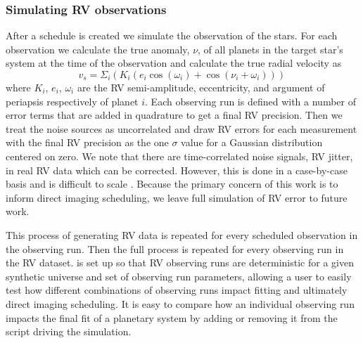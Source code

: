 \subsubsection{Simulating RV observations}
After a schedule is created we simulate the observation of the stars. For each
observation we calculate the true anomaly, $\nu$, of all planets in the target
star's system at the time of the observation and calculate the true radial
velocity as 
\begin{equation}
v_s = \Sigma_i \left(K_i \left(e_i
\cos(\omega_i) + \cos(\nu_i + \omega_i)\right)\right) \,
  \label{eq:system_rv}
\end{equation}
where $K_i$, $e_i$, $\omega_i$ are the RV semi-amplitude, eccentricity, and
argument of periapsis respectively of planet $i$. Each observing run is defined
with a number of error terms that are added in quadrature to get a final RV
precision. Then we treat the noise sources as uncorrelated and draw RV errors
for each measurement with the final RV precision as the one $\sigma$ value for
a Gaussian distribution centered on zero. We note that there are
time-correlated noise signals, RV jitter, in real RV data which can be
corrected. However, this is done in a case-by-case basis and is difficult to
scale \citep{guptaTargetPrioritization2021}. Because the primary concern of
this work is to inform direct imaging scheduling, we leave full simulation of
RV error to future work.


This process of generating RV data is repeated for every scheduled observation in the
observing run. Then the full process is repeated for every observing run in the
RV dataset.  is set up so that RV observing runs are deterministic
for a given synthetic universe and set of observing run parameters, allowing a user to
easily test how different combinations of observing runs impact fitting and
ultimately direct imaging scheduling. It is easy to compare how an individual
observing run impacts the final fit of a planetary system by adding or removing
it from the script driving the simulation.

